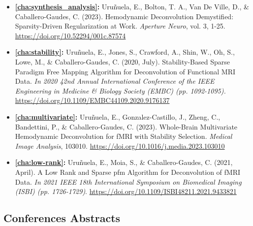 \begin{itemize}
    \item {\textbf{\cref{cha:synthesis_analysis}:} Uruñuela, E., Bolton, T. A.,
    Van De Ville, D., \& Caballero-Gaudes, C. (2023). Hemodynamic Deconvolution
    Demystified: Sparsity-Driven Regularization at Work. \textit{Aperture
    Neuro}, vol. 3, 1-25. \url{https://doi.org/10.52294/001c.87574}}
    \item {\textbf{\cref{cha:stability}:} Uruñuela, E., Jones, S., Crawford, A.,
    Shin, W., Oh, S., Lowe, M., \& Caballero-Gaudes, C. (2020, July).
    Stability-Based Sparse Paradigm Free Mapping Algorithm for Deconvolution of
    Functional MRI Data. \textit{In 2020 42nd Annual International Conference of
    the IEEE Engineering in Medicine \& Biology Society (EMBC) (pp. 1092-1095).}
    \url{https://doi.org/10.1109/EMBC44109.2020.9176137}}
    \item {\textbf{\cref{cha:multivariate}:} Uruñuela, E., Gonzalez-Castillo,
    J., Zheng, C., Bandettini, P., \& Caballero-Gaudes, C. (2023). Whole-Brain
    Multivariate Hemodynamic Deconvolution for fMRI with Stability Selection.
    \textit{Medical Image Analysis}, 103010.
    \url{https://doi.org/10.1016/j.media.2023.103010}}
    \item {\textbf{\cref{cha:low-rank}:} Uruñuela, E., Moia, S., \&
    Caballero-Gaudes, C. (2021, April). A Low Rank and Sparse \acrlong*{pfm}
    Algorithm for Deconvolution of fMRI Data. \textit{In 2021 IEEE 18th
    International Symposium on Biomedical Imaging (ISBI) (pp. 1726-1729)}.
    \url{https://doi.org/10.1109/ISBI48211.2021.9433821}}
\end{itemize}

\subsection{Conferences Abstracts}

